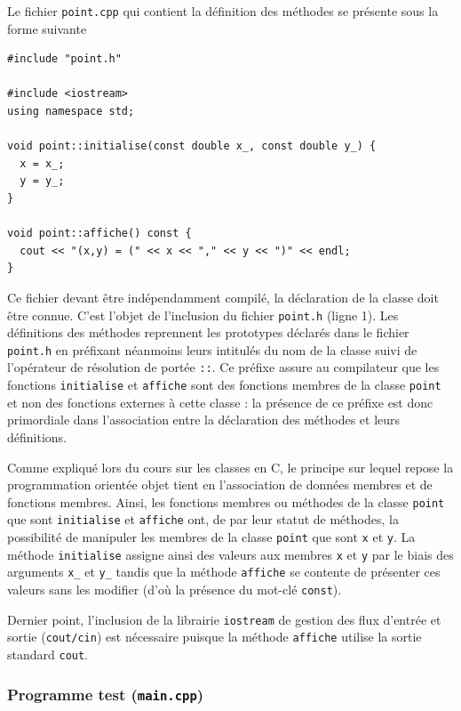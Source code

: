 \documentclass{book}
\newcommand{\cpp}{\mbox{C\vspace{.5em}\protect\raisebox{.2ex}{\footnotesize++~}}}
\begin{document}
\begin{correction}
Le fichier \texttt{point.cpp} qui contient la définition des méthodes se présente sous la
forme suivante

\begin{verbatim}
#include "point.h"

#include <iostream>
using namespace std;

void point::initialise(const double x_, const double y_) {
  x = x_;
  y = y_;
}

void point::affiche() const {
  cout << "(x,y) = (" << x << "," << y << ")" << endl;
}
\end{verbatim}

Ce fichier devant être indépendamment compilé, la déclaration de la classe doit
être connue. C'est l'objet de l'inclusion du fichier \texttt{point.h} (ligne 1). Les
définitions des méthodes reprennent les prototypes déclarés dans le fichier
\texttt{point.h} en préfixant néanmoins leurs intitulés du nom de la classe suivi de
l'opérateur de résolution de portée \texttt{::}. Ce préfixe assure au compilateur que les
fonctions \texttt{initialise} et \texttt{affiche} sont des fonctions membres de la classe \texttt{point} et
non des fonctions externes à cette classe : la présence de ce préfixe est donc
primordiale dans l'association entre la déclaration des méthodes et leurs
définitions.

Comme expliqué lors du cours sur les classes en \cpp, le principe sur lequel
repose la programmation orientée objet tient en l'association de données membres
et de fonctions membres. Ainsi, les fonctions membres ou méthodes de la classe
\texttt{point} que sont \texttt{initialise} et \texttt{affiche} ont, de par leur statut de méthodes, la
possibilité de manipuler les membres de la classe \texttt{point} que sont \texttt{x} et \texttt{y}. La
méthode \texttt{initialise} assigne ainsi des valeurs aux membres \texttt{x} et \texttt{y} par le biais
des arguments \texttt{x\_} et \texttt{y\_} tandis que la méthode \texttt{affiche} se contente de présenter
ces valeurs sans les modifier (d'où la présence du mot-clé \texttt{const}).

Dernier point, l'inclusion de la librairie \texttt{iostream} de gestion des
flux d'entrée et sortie (\texttt{cout/cin}) est nécessaire puisque la méthode \texttt{affiche}
utilise la sortie standard \texttt{cout}.

\subsubsection*{Programme test (\texttt{main.cpp})}


\end{correction}
\end{document}
